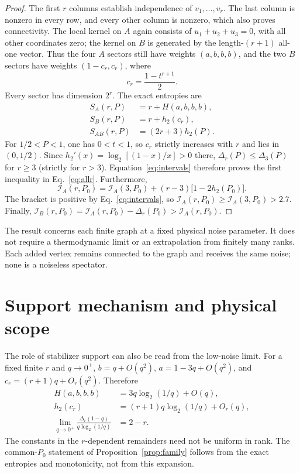 \documentclass[11pt,a4paper]{article}
\newcommand{\IA}{\mathcal I_A}
\newcommand{\IB}{\mathcal I_B}
\begin{document}
\begin{proof}
The first $r$ columns establish independence of $v_1,\ldots,v_r$.
The last column is nonzero in every row, and every other column is nonzero,
which also proves connectivity. The local kernel on $A$ again consists of
$u_1+u_2+u_3=0$, with all other coordinates zero; the kernel on $B$ is
generated by the length-$(r+1)$ all-one vector. Thus the four $A$ sectors
still have weights $(a,b,b,b)$, and the two $B$ sectors have weights
$(1-c_r,c_r)$, where
\begin{equation}
 c_r=\frac{1-t^{r+1}}2.
 \label{eq:cr}
\end{equation}
Every sector has dimension $2^r$. The exact entropies are
\begin{align}
 S_A(r,P)&=r+H(a,b,b,b),\nonumber\\
 S_B(r,P)&=r+h_2(c_r),\nonumber\\
 S_{AB}(r,P)&=(2r+3)h_2(P).
 \label{eq:familyentropy}
\end{align}
For $1/2<P<1$, one has $0<t<1$, so $c_r$ strictly increases with $r$ and
lies in $(0,1/2)$. Since $h_2'(x)=\log_2[(1-x)/x]>0$ there,
$\Delta_r(P)\leq\Delta_3(P)$ for $r\geq3$ (strictly for $r>3$).
Equation~\eqref{eq:intervals} therefore proves the first inequality in
Eq.~\eqref{eq:allr}. Furthermore,
\begin{equation}
 \IA(r,P_0)=\IA(3,P_0)+(r-3)\bigl[1-2h_2(P_0)\bigr].
 \label{eq:slope}
\end{equation}
The bracket is positive by Eq.~\eqref{eq:intervals}, so
$\IA(r,P_0)\geq\IA(3,P_0)>2.7$. Finally,
$\IB(r,P_0)=\IA(r,P_0)-\Delta_r(P_0)>\IA(r,P_0)$.
\end{proof}

The result concerns each finite graph at a fixed physical noise parameter.
It does not require a thermodynamic limit or an extrapolation from finitely
many ranks. Each added vertex remains connected to the graph and receives
the same noise; none is a noiseless spectator.

\section{Support mechanism and physical scope}\label{sec:scope}

The role of stabilizer support can also be read from the low-noise limit.
For a fixed finite $r$ and $q\to0^+$,
$b=q+O(q^2)$, $a=1-3q+O(q^2)$, and
$c_r=(r+1)q+O_r(q^2)$. Therefore
\begin{align}
 H(a,b,b,b)&=3q\log_2(1/q)+O(q),\nonumber\\
 h_2(c_r)&=(r+1)q\log_2(1/q)+O_r(q),\nonumber\\
 \lim_{q\to0^+}\frac{\Delta_r(1-q)}{q\log_2(1/q)}&=2-r.
 \label{eq:asymptotic}
\end{align}
The constants in the $r$-dependent remainders need not be uniform in rank.
The common-$P_0$ statement of Proposition~\ref{prop:family} follows from
the exact entropies and monotonicity, not from this expansion.
\end{document}
